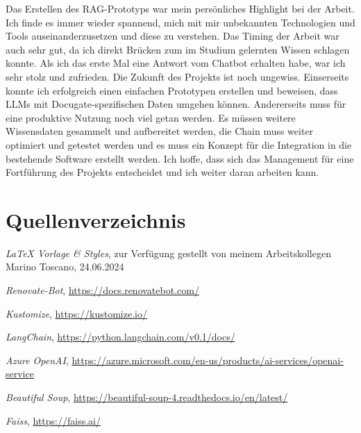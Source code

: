 \documentclass{bpraxis}
\begin{document}
Das Erstellen des RAG-Prototyps war mein persönliches Highlight bei der Arbeit. Ich finde es immer wieder spannend, mich mit mir unbekannten Technologien und Tools auseinanderzusetzen und diese zu verstehen.
Das Timing der Arbeit war auch sehr gut, da ich direkt Brücken zum im Studium gelernten Wissen schlagen konnte. Als ich das erste Mal eine Antwort vom Chatbot erhalten habe, war ich sehr stolz und zufrieden.
Die Zukunft des Projekts ist noch ungewiss. Einserseits konnte ich erfolgreich einen einfachen Prototypen erstellen und beweisen, dass LLMs mit Docugate-spezifischen Daten umgehen können. Andererseits muss
für eine produktive Nutzung noch viel getan werden. Es müssen weitere Wissensdaten gesammelt und aufbereitet werden, die Chain muss weiter optimiert und getestet werden und es muss ein Konzept für die
Integration in die bestehende Software erstellt werden. Ich hoffe, dass sich das Management für eine Fortführung des Projekts entscheidet und ich weiter daran arbeiten kann.

\section{Quellenverzeichnis}

\textit{LaTeX Vorlage \& Styles}, zur Verfügung gestellt von meinem Arbeitskollegen Marino Toscano, 24.06.2024\label{lit:latex-vorlage}

\textit{Renovate-Bot}, \href{https://docs.renovatebot.com/}{https://docs.renovatebot.com/}\label{lit:renovatebot}

\textit{Kustomize}, \href{https://kustomize.io/}{https://kustomize.io/}\label{lit:kustomize}

\textit{LangChain}, \href{https://python.langchain.com/v0.1/docs/}{https://python.langchain.com/v0.1/docs/}\label{lit:langchain}

\textit{Azure OpenAI}, \href{https://azure.microsoft.com/en-us/products/ai-services/openai-service}{https://azure.microsoft.com/en-us/products/ai-services/openai-service}\label{lit:azure-openai}

\textit{Beautiful Soup}, \href{https://beautiful-soup-4.readthedocs.io/en/latest/}{https://beautiful-soup-4.readthedocs.io/en/latest/}\label{lit:beautiful-soup}

\textit{Faiss}, \href{https://faiss.ai/}{https://faiss.ai/}\label{lit:faiss}
\end{document}

